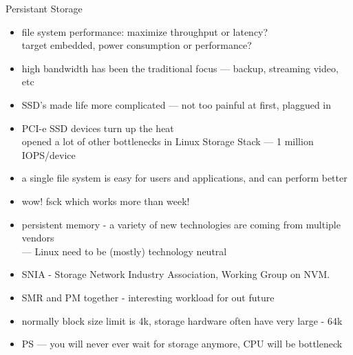 \documentclass[aspectratio=169]{beamer}
\begin{document}
\begin{frame}{Persistant Storage}
  \begin{itemize}
  \item file system performance: maximize throughput or latency?
        \\target embedded, power consumption or performance?
  \item high bandwidth has been the traditional focus --- backup, streaming video, etc
  \item SSD's made life more complicated --- not too painful at first, plaggued in
  \item PCI-e SSD devices turn up the heat
        \\opened a lot of other bottlenecks in Linux Storage Stack --- 1 million IOPS/device
  \item a single file system is easy for users and applications, and can perform better
  \item wow! fsck which works more than week!
  \item persistent memory - a variety of new technologies are coming from multiple vendors
        \\--- Linux need to be (mostly) technology neutral
  \item SNIA - Storage Network Industry Association, Working Group on NVM.
  \item SMR and PM together - interesting workload for out future
  \item normally block size limit is 4k, storage hardware often have very large - 64k
  \item PS --- you will never ever wait for storage anymore, CPU will be bottleneck
  \end{itemize}
\end{frame} 
\end{document}
